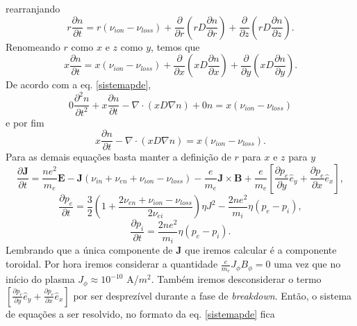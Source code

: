 \documentclass[12pt,oneside,a4paper]{abntex2}
\begin{document}
rearranjando
\begin{equation}
r \frac{\partial n}{\partial t} = r ( \nu_{ion} - \nu_{loss} ) + \frac{\partial}{\partial r}\left(r D \frac{\partial n}{\partial r}\right)
+ \frac{\partial}{\partial z}\left(r D \frac{\partial n}{\partial z}\right) .
\end{equation}
Renomeando $r$ como $x$ e $z$ como $y$, temos que
\begin{equation}
x \frac{\partial n}{\partial t} = x ( \nu_{ion} - \nu_{loss} ) + \frac{\partial}{\partial x}\left(x D \frac{\partial n}{\partial x}\right)
+ \frac{\partial}{\partial y}\left(x D \frac{\partial n}{\partial y}\right) .
\end{equation}
De acordo com a eq. \ref{sistemapde}, 
\begin{equation}
0 \frac{\partial^2 n}{\partial t^2} +  x \frac{\partial n}{\partial t} - \nabla \cdot \left( x D \nabla n \right) + 0 n = x ( \nu_{ion} - \nu_{loss} ) 
\end{equation}
e por fim
\begin{equation}
x \frac{\partial n}{\partial t} - \nabla \cdot \left( x D \nabla n \right) = x ( \nu_{ion} - \nu_{loss} ) .
\end{equation}
Para as demais equações basta manter a definição de $r$ para $x$ e $z$ para $y$
\begin{equation}
\frac{\partial \bm{J}}{\partial t} =  \frac{ne^2}{m_e} \bm{E} -\bm{J}(\nu_{in}+\nu_{en}+\nu_{ion}-\nu_{loss}) -\frac{e}{m_e}\bm{J} \times \bm{B}+\frac{e}{m_e} \left[ \frac{\partial p_e}{\partial y} \hat{e}_y + \frac{\partial p_e}{\partial x} \hat{e}_x \right],
\end{equation}
\begin{equation}
\frac{\partial p_e}{\partial t} = \frac{3}{2}(1+\frac{2 \nu_{en} + \nu_{ion} - \nu_{loss}}{2\nu_{ei}})\eta J^2  -\frac{2ne^2}{m_i} \eta (p_e-p_i),
\end{equation}
\begin{equation}
\frac{\partial p_i}{\partial t} = \frac{2ne^2}{m_i}\eta(p_e-p_i) .
\end{equation}
Lembrando que a única componente de $\bm{J}$ que iremos calcular é a componente toroidal. Por hora iremos considerar a quantidade $\frac{e}{m_e}J_\phi  B_\phi=0$ uma vez que no início do plasma $J_\phi \approx 10^{-10}$ A/$m^2$. Também iremos desconsiderar o termo $\left[ \frac{\partial p_e}{\partial y} \hat{e}_y + \frac{\partial p_e}{\partial x} \hat{e}_x \right]$ por ser desprezível durante a fase de \textit{breakdown}. Então, o sistema de equações a ser resolvido, no formato da eq. \ref{sistemapde} fica
\end{document}
